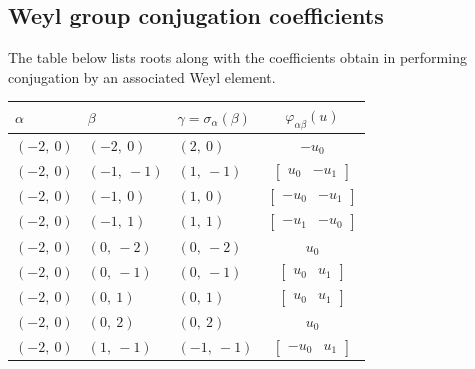 \documentclass[11pt]{article}
\newcommand{\noi}{\noindent}
\theoremstyle{definition}
\begin{document}
\subsection{Weyl group conjugation coefficients}

The table below lists roots along with the coefficients obtain in performing conjugation by an associated Weyl element.

\bigskip

\noi \noindent \begin{longtable}{|l|l|l|c|}
    \hline
    \textbf{$\alpha$} & \textbf{$\beta$} & \textbf{$\gamma = \sigma_{\alpha}(\beta)$} & $\varphi_{\alpha\beta}(u)$ \\
    \hline
    \endhead
    $\left( -2, \  0\right)$ & $\left( -2, \  0\right)$ & $\left( 2, \  0\right)$ & $- u_{0}$ \\
    \hline
    $\left( -2, \  0\right)$ & $\left( -1, \  -1\right)$ & $\left( 1, \  -1\right)$ & $\left[\begin{matrix}u_{0} & - u_{1}\end{matrix}\right]$ \\
    \hline
    $\left( -2, \  0\right)$ & $\left( -1, \  0\right)$ & $\left( 1, \  0\right)$ & $\left[\begin{matrix}- u_{0} & - u_{1}\end{matrix}\right]$ \\
    \hline
    $\left( -2, \  0\right)$ & $\left( -1, \  1\right)$ & $\left( 1, \  1\right)$ & $\left[\begin{matrix}- u_{1} & - u_{0}\end{matrix}\right]$ \\
    \hline
    $\left( -2, \  0\right)$ & $\left( 0, \  -2\right)$ & $\left( 0, \  -2\right)$ & $u_{0}$ \\
    \hline
    $\left( -2, \  0\right)$ & $\left( 0, \  -1\right)$ & $\left( 0, \  -1\right)$ & $\left[\begin{matrix}u_{0} & u_{1}\end{matrix}\right]$ \\
    \hline
    $\left( -2, \  0\right)$ & $\left( 0, \  1\right)$ & $\left( 0, \  1\right)$ & $\left[\begin{matrix}u_{0} & u_{1}\end{matrix}\right]$ \\
    \hline
    $\left( -2, \  0\right)$ & $\left( 0, \  2\right)$ & $\left( 0, \  2\right)$ & $u_{0}$ \\
    \hline
    $\left( -2, \  0\right)$ & $\left( 1, \  -1\right)$ & $\left( -1, \  -1\right)$ & $\left[\begin{matrix}- u_{0} & u_{1}\end{matrix}\right]$ \\

\end{longtable}
\end{document}
